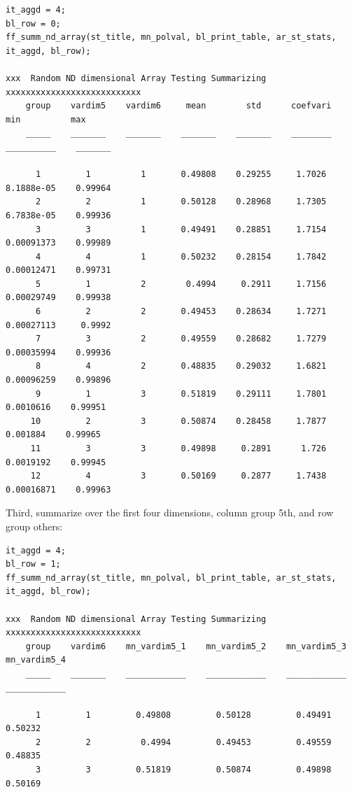\documentclass[
]{book}
\begin{document}
\begin{verbatim}
it_aggd = 4; 
bl_row = 0; 
ff_summ_nd_array(st_title, mn_polval, bl_print_table, ar_st_stats, it_aggd, bl_row);

xxx  Random ND dimensional Array Testing Summarizing  xxxxxxxxxxxxxxxxxxxxxxxxxxx
    group    vardim5    vardim6     mean        std      coefvari       min          max  
    _____    _______    _______    _______    _______    ________    __________    _______

      1         1          1       0.49808    0.29255     1.7026     8.1888e-05    0.99964
      2         2          1       0.50128    0.28968     1.7305     6.7838e-05    0.99936
      3         3          1       0.49491    0.28851     1.7154     0.00091373    0.99989
      4         4          1       0.50232    0.28154     1.7842     0.00012471    0.99731
      5         1          2        0.4994     0.2911     1.7156     0.00029749    0.99938
      6         2          2       0.49453    0.28634     1.7271     0.00027113     0.9992
      7         3          2       0.49559    0.28682     1.7279     0.00035994    0.99936
      8         4          2       0.48835    0.29032     1.6821     0.00096259    0.99896
      9         1          3       0.51819    0.29111     1.7801      0.0010616    0.99951
     10         2          3       0.50874    0.28458     1.7877       0.001884    0.99965
     11         3          3       0.49898     0.2891      1.726      0.0019192    0.99945
     12         4          3       0.50169     0.2877     1.7438     0.00016871    0.99963
\end{verbatim}

Third, summarize over the first four dimensions, column group 5th, and
row group others:

\begin{verbatim}
it_aggd = 4; 
bl_row = 1; 
ff_summ_nd_array(st_title, mn_polval, bl_print_table, ar_st_stats, it_aggd, bl_row);

xxx  Random ND dimensional Array Testing Summarizing  xxxxxxxxxxxxxxxxxxxxxxxxxxx
    group    vardim6    mn_vardim5_1    mn_vardim5_2    mn_vardim5_3    mn_vardim5_4
    _____    _______    ____________    ____________    ____________    ____________

      1         1         0.49808         0.50128         0.49491         0.50232   
      2         2          0.4994         0.49453         0.49559         0.48835   
      3         3         0.51819         0.50874         0.49898         0.50169   
\end{verbatim}
\end{document}
